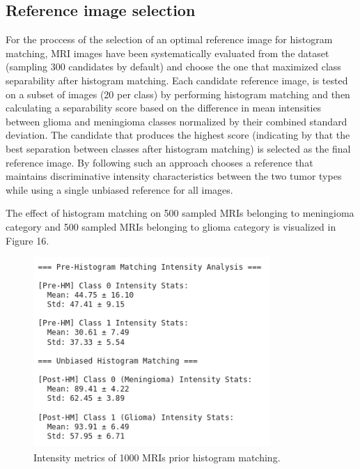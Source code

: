 \documentclass[11pt,a4paper]{article}
\begin{document}
\subsection{Reference image selection}

For the proccess of the selection of an optimal reference image for histogram matching, MRI images have been systematically evaluated
from the dataset (sampling 300 candidates by default) and choose the one that maximized class separability after histogram matching.
Each candidate reference image, is tested on a subset of images (20 per class) 
by performing histogram matching and then calculating a separability score based on the 
difference in mean intensities between glioma and meningioma classes 
normalized by their combined standard deviation. The candidate that produces the highest score (indicating by that
the best separation between classes after histogram matching) is selected as the final reference image. 
By following such an approach chooses a reference that maintains discriminative 
intensity characteristics between the two tumor types while using a single unbiased 
reference for all images.

The effect of histogram matching on 500 sampled MRIs belonging to meningioma category and 500 sampled MRIs belonging to glioma category is 
visualized in Figure 16.

		\begin{figure}[H]
			\centering
			\includegraphics[width=0.8\textwidth]{images/pre_hm_stats.png}
			\caption{Intensity metrics of 1000 MRIs prior histogram matching.}
			\label{fig1:}
		\end{figure}		
\end{document}
